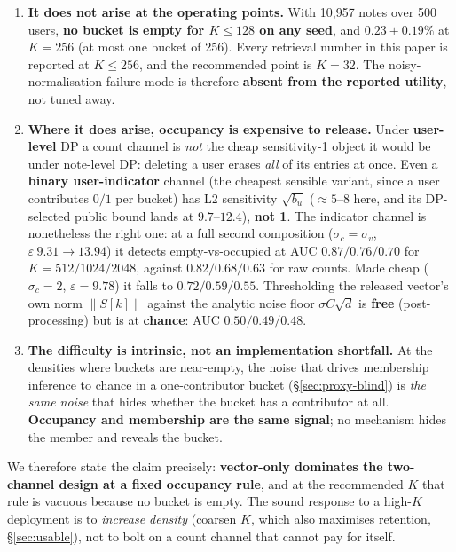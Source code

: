 \documentclass[pdflatex,sn-mathphys-num,iicol]{sn-jnl}
\theoremstyle{thmstyleone}%
\theoremstyle{thmstyletwo}%
\theoremstyle{thmstylethree}%
\newcommand{\eps}{\varepsilon}
\newcommand{\norm}[1]{\left\lVert #1 \right\rVert}
\newcommand{\secref}[1]{\S\ref{#1}}
\begin{document}
\begin{enumerate}
  \item \textbf{It does not arise at the operating points.} With 10{,}957 notes over
    500 users, \textbf{no bucket is empty for $K \leq 128$ on any seed}, and
    $0.23 \pm 0.19\%$ at $K = 256$ (at most one bucket of 256). Every retrieval
    number in this paper is reported at $K \leq 256$, and the recommended point is
    $K = 32$. The noisy-normalisation failure mode is therefore \textbf{absent from
    the reported utility}, not tuned away.

  \item \textbf{Where it does arise, occupancy is expensive to release.} Under
    \textbf{user-level} DP a count channel is \emph{not} the cheap sensitivity-1
    object it would be under note-level DP: deleting a user erases \emph{all} of its
    entries at once. Even a \textbf{binary user-indicator} channel (the cheapest
    sensible variant, since a user contributes $0/1$ per bucket) has L2 sensitivity
    $\sqrt{b_u}$ ($\approx 5$--$8$ here, and its DP-selected public bound lands at
    $9.7$--$12.4$), \textbf{not 1}. The indicator channel is nonetheless the right
    one: at a full second composition ($\sigma_c = \sigma_v$, $\eps\ 9.31 \to 13.94$)
    it detects empty-vs-occupied at AUC $0.87 / 0.76 / 0.70$ for
    $K = 512 / 1024 / 2048$, against $0.82 / 0.68 / 0.63$ for raw counts. Made cheap
    ($\sigma_c = 2$, $\eps = 9.78$) it falls to $0.72 / 0.59 / 0.55$. Thresholding
    the released vector's own norm $\norm{S[k]}$ against the analytic noise floor
    $\sigma C \sqrt{d}$ is \textbf{free} (post-processing) but is at \textbf{chance}:
    AUC $0.50 / 0.49 / 0.48$.

  \item \textbf{The difficulty is intrinsic, not an implementation shortfall.} At the
    densities where buckets are near-empty, the noise that drives membership inference
    to chance in a one-contributor bucket (\secref{sec:proxy-blind}) is \emph{the same
    noise} that hides whether the bucket has a contributor at all. \textbf{Occupancy
    and membership are the same signal}; no mechanism hides the member and reveals the
    bucket.
\end{enumerate}

We therefore state the claim precisely: \textbf{vector-only dominates the two-channel
design at a fixed occupancy rule}, and at the recommended $K$ that rule is vacuous
because no bucket is empty. The sound response to a high-$K$ deployment is to
\emph{increase density} (coarsen $K$, which also maximises retention,
\secref{sec:usable}), not to bolt on a count channel that cannot pay for itself.
\end{document}
